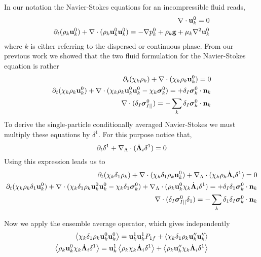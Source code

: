 In our notation the Navier-Stokes equations for an incompressible fluid reads, 
\begin{align}
    \mathbf{\nabla}\cdot \textbf{u}_k^0  = 0 \\
    \partial_t (\rho_k \textbf{u}_k^0 )
    + \mathbf{\nabla}\cdot(\rho_k \textbf{u}_k^0  \textbf{u}_k^0 ) 
    = - \mathbf{\nabla} p_k^0 
    + \rho_k \textbf{g}
    + \mu_k \mathbf{\nabla}^2 \textbf{u}_k^0
\end{align}
where $k$ is either referring to the dispersed or continuous phase. 
From our previous work we showed that the two fluid formulation for the Navier-Stokes equation is rather 
\begin{align}
    \partial_t (\chi_k \rho_k )
    + \mathbf{\nabla}\cdot (
        \chi_k \rho_k  \textbf{u}_k^0
        )
        = 
        0 \\
        \partial_t (\chi_k \rho_k \textbf{u}_k^0)
        + \mathbf{\nabla}\cdot (
        \chi_k \rho_k \textbf{u}_k^0 \textbf{u}_k^0
        - \chi_k \bm\sigma_k^0 
        )
    = 
    + \delta_I
         \bm\sigma_k^0
    \cdot \textbf{n}_k\\
        \mathbf{\nabla}\cdot (\delta_I \bm\sigma_{I||}^0 )
        = 
        - \sum_k
        \delta_I
        \bm\sigma_k^0
   \cdot \textbf{n}_k
\end{align}
To derive the single-particle conditionally averaged Navier-Stokes we must multiply these equations by $\delta^1$. 
For this purpose notice that, 
\begin{equation}
    \partial_t \delta^1+\mathbf{\nabla}_\Lambda\cdot(\dot{\bm\Lambda}_i \delta^1 ) = 0 
\end{equation} 
Using this expression leads us to 
\begin{align}
    \partial_t (\chi_k \delta_1 \rho_k )
    + \mathbf{\nabla}\cdot (
        \chi_k  \delta_1 \rho_k  \textbf{u}_k^0
        )
    +  \mathbf{\nabla}_\Lambda \cdot (\chi_k \rho_k \dot{\bm\Lambda}_i \delta^1)
    = 
    0 \\
    \partial_t (\chi_k \rho_k \delta_1 \textbf{u}_k^0)
    + \mathbf{\nabla}\cdot (
        \chi_k\delta_1 \rho_k \textbf{u}_k^0 \textbf{u}_k^0
        - \chi_k\delta_1 \bm\sigma_k^0 
        )
    +  \mathbf{\nabla}_\Lambda \cdot ( \rho_k \textbf{u}_k^0 \chi_k \dot{\bm\Lambda}_i \delta^1)
    = 
    + \delta_I\delta_1
         \bm\sigma_k^0
    \cdot \textbf{n}_k\\
        \mathbf{\nabla}\cdot (\delta_I \bm\sigma_{I||}^0 \delta_1 )
        = 
        - \sum_k\delta_1
        \delta_I
        \bm\sigma_k^0
   \cdot \textbf{n}_k
\end{align}

Now we apply the ensemble average operator, which gives independently 
\begin{align}
    \left<\chi_k\delta_1 \rho_k \textbf{u}_k^0 \textbf{u}_k^0\right>
    = 
    \textbf{u}_k^1 \textbf{u}_k^1 P_{1f}
    + \left<\chi_k\delta_1 \rho_k \textbf{u}_k'' \textbf{u}_k''\right>\\
    \left<\rho_k \textbf{u}_k^0 \chi_k \dot{\bm\Lambda}_i \delta^1\right>
    = 
    \textbf{u}_k^1 \left<\rho_k  \chi_k \dot{\bm\Lambda}_i \delta^1\right>
    + \left<\rho_k \textbf{u}_k'' \chi_k \dot{\bm\Lambda}_i \delta^1\right>
\end{align}

